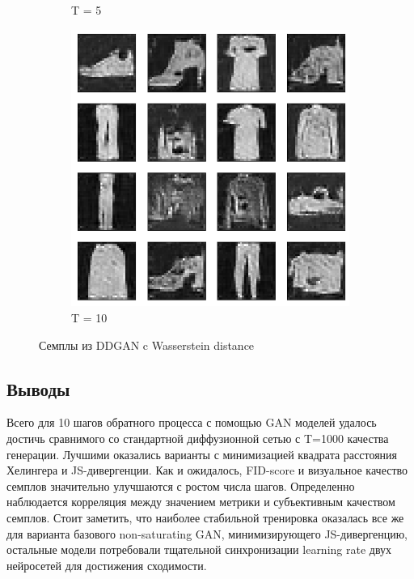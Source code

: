 \documentclass{article}
\begin{document}
\begin{figure}[H]
\begin{subfigure}[h]{0.3\linewidth}
		\caption{T = 5}
	\end{subfigure}
	\hfill
	\begin{subfigure}[h]{0.3\linewidth}
		\centering
		\includegraphics[scale=0.3]{../code/figures/generated_DDGAN_wd_10.png}
		\caption{T = 10}
	\end{subfigure}
	\caption{Семплы из DDGAN c Wasserstein distance}\label{ddgan_wd_samples}	
\end{figure}

\subsection{Выводы}
Всего для 10 шагов обратного процесса с помощью GAN моделей удалось достичь сравнимого со стандартной диффузионной сетью с T=1000 качества генерации. Лучшими оказались варианты с минимизацией квадрата расстояния Хелингера и JS-дивергенции. Как и ожидалось, FID-score и визуальное качество семплов значительно улучшаются с ростом числа шагов. Определенно наблюдается корреляция между значением метрики и субъективным качеством семплов. Стоит заметить, что наиболее стабильной тренировка оказалась все же для варианта базового non-saturating GAN, минимизирующего JS-дивергенцию, остальные модели потребовали тщательной синхронизации learning rate двух нейросетей для достижения сходимости.
\end{document}
